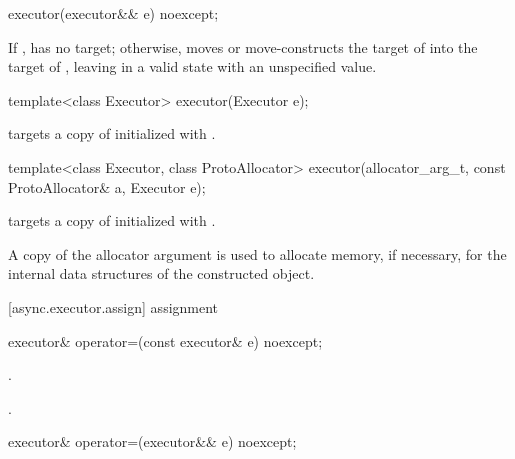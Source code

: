 %
\begin{itemdecl}
executor(executor&& e) noexcept;
\end{itemdecl}

\begin{itemdescr}
\pnum
\effects If ,  has no target; otherwise, moves  or move-constructs the target of  into the target of , leaving  in a valid state with an unspecified value.
\end{itemdescr}

%
\begin{itemdecl}
template<class Executor> executor(Executor e);
\end{itemdecl}

\begin{itemdescr}
\pnum
\effects {} targets a copy of  initialized with .
\end{itemdescr}

%
\begin{itemdecl}
template<class Executor, class ProtoAllocator>
  executor(allocator_arg_t, const ProtoAllocator& a, Executor e);
\end{itemdecl}

\begin{itemdescr}
\pnum
\effects {} targets a copy of  initialized with .

\pnum
A copy of the allocator argument is used to allocate memory, if necessary, for the internal data structures of the constructed  object.
\end{itemdescr}



[async.executor.assign]{ assignment}

%
\begin{itemdecl}
executor& operator=(const executor& e) noexcept;
\end{itemdecl}

\begin{itemdescr}
\pnum
\effects {}.

\pnum
\returns {}.
\end{itemdescr}

%
\begin{itemdecl}
executor& operator=(executor&& e) noexcept;
\end{itemdecl}

